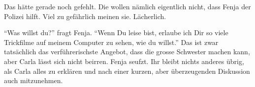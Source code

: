 Das hätte gerade noch gefehlt. Die wollen nämlich eigentlich nicht, dass Fenja der Polizei hilft. Viel zu gefährlich meinen sie. Lächerlich. 

\enquote{Was willst du?} fragt Fenja. \enquote{Wenn Du leise bist, erlaube ich Dir so viele Trickfilme auf meinem Computer zu sehen, wie du willst.} Das ist zwar tatsächlich das verführerischste Angebot, dass die grosse Schwester machen kann, aber Carla lässt sich nicht beirren. Fenja seufzt. Ihr bleibt nichts anderes übrig, als Carla alles zu erklären und nach einer kurzen, aber überzeugenden Diskussion auch mitzunehmen. 


